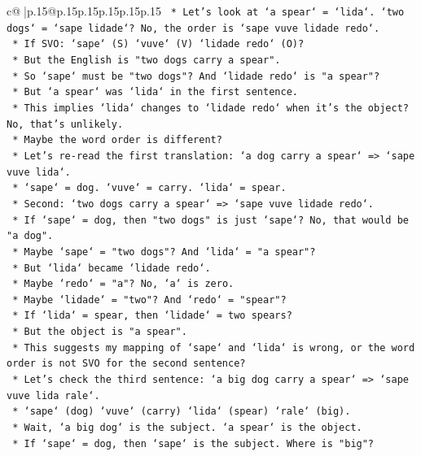 \documentclass{article}
\begin{document}
{\begin{supertabular}{c@{$\;$}|p{.15\linewidth}@{}p{.15\linewidth}p{.15\linewidth}p{.15\linewidth}p{.15\linewidth}p{.15\linewidth}}
{{{\texttt{    *   Let's look at `a spear` = `lida`. `two dogs` = `sape lidade`? No, the order is `sape vuve lidade redo`.} \\
\texttt{    *   If SVO: `sape` (S) `vuve` (V) `lidade redo` (O)?} \\
\texttt{    *   But the English is "two dogs carry a spear".} \\
\texttt{    *   So `sape` must be "two dogs"? And `lidade redo` is "a spear"?} \\
\texttt{    *   But `a spear` was `lida` in the first sentence.} \\
\texttt{    *   This implies `lida` changes to `lidade redo` when it's the object? No, that's unlikely.} \\
\texttt{    *   Maybe the word order is different?} \\
\texttt{    *   Let's re{-}read the first translation: `a dog carry a spear` => `sape vuve lida`.} \\
\texttt{        *   `sape` = dog. `vuve` = carry. `lida` = spear.} \\
\texttt{    *   Second: `two dogs carry a spear` => `sape vuve lidade redo`.} \\
\texttt{        *   If `sape` = dog, then "two dogs" is just `sape`? No, that would be "a dog".} \\
\texttt{        *   Maybe `sape` = "two dogs"? And `lida` = "a spear"?} \\
\texttt{        *   But `lida` became `lidade redo`.} \\
\texttt{        *   Maybe `redo` = "a"? No, `a` is zero.} \\
\texttt{        *   Maybe `lidade` = "two"? And `redo` = "spear"?} \\
\texttt{        *   If `lida` = spear, then `lidade` = two spears?} \\
\texttt{        *   But the object is "a spear".} \\
\texttt{        *   This suggests my mapping of `sape` and `lida` is wrong, or the word order is not SVO for the second sentence?} \\
\texttt{        *   Let's check the third sentence: `a big dog carry a spear` => `sape vuve lida rale`.} \\
\texttt{        *   `sape` (dog) `vuve` (carry) `lida` (spear) `rale` (big).} \\
\texttt{        *   Wait, `a big dog` is the subject. `a spear` is the object.} \\
\texttt{        *   If `sape` = dog, then `sape` is the subject. Where is "big"?} \\
}}}
\end{supertabular}}
\end{document}
